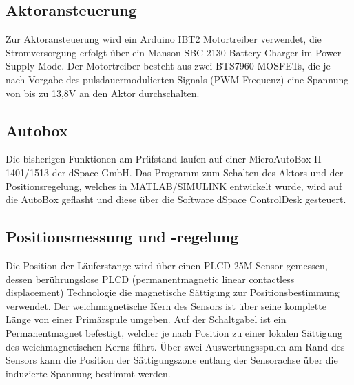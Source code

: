 \subsection{Aktoransteuerung}

Zur Aktoransteuerung wird ein Arduino IBT2 Motortreiber verwendet, die Stromversorgung erfolgt über ein Manson SBC-2130 Battery Charger im Power Supply Mode. Der Motortreiber besteht aus zwei BTS7960 MOSFETs, die je nach Vorgabe des pulsdauermodulierten Signals (PWM-Frequenz) eine Spannung von bis zu 13,8V an den Aktor durchschalten. 

\subsection{Autobox}

Die bisherigen Funktionen am Prüfstand laufen auf einer MicroAutoBox II 1401/1513 der dSpace GmbH. Das Programm zum Schalten des Aktors und der Positionsregelung, welches in MATLAB/SIMULINK entwickelt wurde, wird auf die AutoBox geflasht und diese über die Software dSpace ControlDesk gesteuert.

\subsection {Positionsmessung und -regelung}

Die Position der Läuferstange wird über einen PLCD-25M Sensor gemessen, dessen berührungslose PLCD (permanentmagnetic linear contactless displacement) Technologie die magnetische Sättigung zur Positionsbestimmung verwendet. Der weichmagnetische Kern des Sensors ist über seine komplette Länge von einer Primärspule umgeben. Auf der Schaltgabel ist ein Permanentmagnet befestigt, welcher je nach Position zu einer lokalen Sättigung des weichmagnetischen Kerns führt. Über zwei Auswertungsspulen am Rand des Sensors kann die Position der Sättigungszone entlang der Sensorachse über die induzierte Spannung bestimmt werden.

